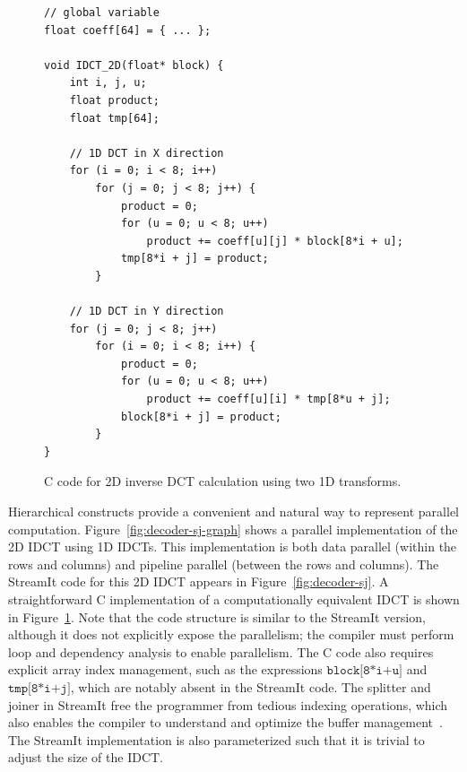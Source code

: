\begin{figure}[h]
  \begin{center}
    \begin{minipage}{4in}
      \begin{small}
        \begin{verbatim}
// global variable
float coeff[64] = { ... };
      
void IDCT_2D(float* block) {
    int i, j, u;
    float product;
    float tmp[64];
        
    // 1D DCT in X direction
    for (i = 0; i < 8; i++)
        for (j = 0; j < 8; j++) {
            product = 0;
            for (u = 0; u < 8; u++)
                product += coeff[u][j] * block[8*i + u];
            tmp[8*i + j] = product;
        }

    // 1D DCT in Y direction
    for (j = 0; j < 8; j++)
        for (i = 0; i < 8; i++) {
            product = 0;
            for (u = 0; u < 8; u++)
                product += coeff[u][i] * tmp[8*u + j];
            block[8*i + j] = product;
        }
}
        \end{verbatim}
      \end{small}
    \end{minipage}
  \end{center}
  \caption{C code for 2D inverse DCT calculation using two 1D transforms.}
  \label{fig:idct_creference}
\end{figure}

Hierarchical constructs provide a convenient and natural
way to represent parallel computation. 
Figure~\ref{fig:decoder-sj-graph} shows a parallel
implementation of the 2D IDCT using 1D IDCTs. This
implementation is both data parallel (within the rows and columns) and
pipeline parallel (between the rows and columns). 
The StreamIt code for this 2D IDCT appears in Figure~\ref{fig:decoder-sj}.
A straightforward C implementation of a computationally equivalent
IDCT is shown in Figure~\ref{fig:idct_creference}. Note that
the code structure is similar to the StreamIt version, although it does 
not explicitly expose the parallelism; the compiler must perform loop
and dependency analysis to enable parallelism.
The C code also requires explicit array index management, such as the 
expressions $\texttt{block[8*i+u]}$ and $\texttt{tmp[8*i+j]}$, which are
notably absent in the StreamIt code. 
The splitter and joiner in StreamIt free the programmer from
tedious indexing operations, which also enables the compiler to
understand and optimize the buffer management~\cite{sermulins05lctes}.
The StreamIt implementation is also parameterized such that it is
trivial to adjust the size of the IDCT.

